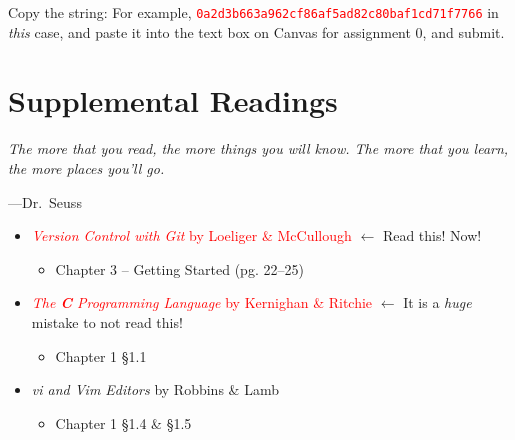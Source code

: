 \documentclass[11pt]{article}
\begin{document}
\begin{enumerate}
    Copy the string: For example,
    \textcolor{red}{\texttt{0a2d3b663a962cf86af5ad82c80baf1cd71f7766}} in
    \emph{this} case, and paste it into the text box on Canvas for assignment 0,
        and submit.
\end{enumerate}

\section{Supplemental Readings}

\epigraph{\emph{The more that you read, the more things you will know. The
more that you learn, the more places you'll go.}}{---Dr.\ Seuss}\noindent

\begin{itemize}

  \item \textcolor{red}{\textit{Version Control with Git} by Loeliger \&
    McCullough} $\leftarrow$ Read this! Now!
    \begin{itemize}
      \item Chapter 3 -- Getting Started (pg. 22--25)
    \end{itemize}

  \item \textcolor{red}{\textit{The \textbf{C} Programming Language} by Kernighan \& Ritchie} $\leftarrow$
    It is a \emph{huge} mistake to not read this!
    \begin{itemize}
      \item Chapter 1 \S 1.1
    \end{itemize}

	\item \textit{vi and Vim Editors} by Robbins \& Lamb
    \begin{itemize}
      \item Chapter 1 \S 1.4 \& \S 1.5
    \end{itemize}

\end{itemize}

\vfill{}
\end{document}

